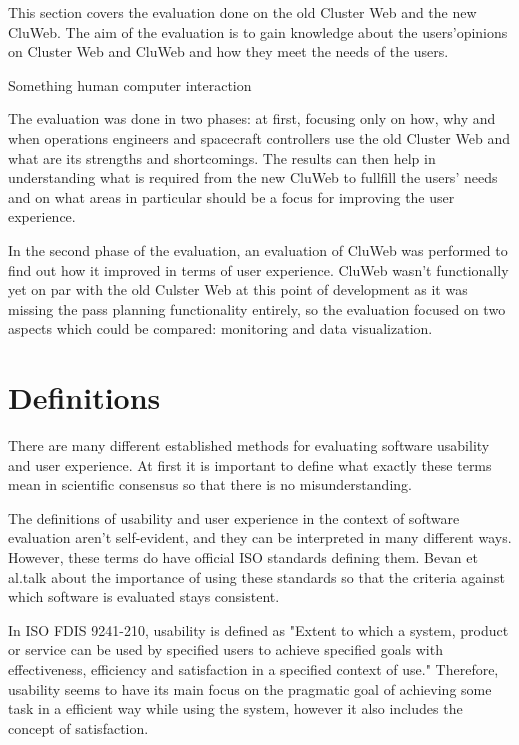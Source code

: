 
This section covers the evaluation done on the old Cluster Web and the new CluWeb. The aim of the evaluation is to gain knowledge about the users'opinions on Cluster Web and CluWeb and how they meet the needs of the users.

Something human computer interaction \cite{4839639}

The evaluation was done in two phases: at first, focusing only on how, why and when operations engineers and spacecraft controllers use the old Cluster Web and what are its strengths and shortcomings. The results can then help in understanding what is required from the new CluWeb to fullfill the users' needs and on what areas in particular should be a focus for improving the user experience.

In the second phase of the evaluation, an evaluation of CluWeb was performed to find out how it improved in terms of user experience. CluWeb wasn't functionally yet on par with the old Culster Web at this point of development as it was missing the pass planning functionality entirely, so the evaluation focused on two aspects which could be compared: monitoring and data visualization.

\section{Definitions}\label{definitions_section}

There are many different established methods for evaluating software usability and user experience. At first it is important to define what exactly these terms mean in scientific consensus so that there is no misunderstanding.

The definitions of usability and user experience in the context of software evaluation aren't self-evident, and they can be interpreted in many different ways. However, these terms do have official ISO standards defining them. Bevan et al.talk about the importance of using these standards so that the criteria against which software is evaluated stays consistent. \cite{bevanstandard}

In  ISO FDIS 9241-210, usability is defined as "Extent to which  a system, product or service can be used by specified users to achieve specified goals with effectiveness, efficiency and satisfaction in a specified context of use." Therefore, usability seems to have its main focus on the pragmatic goal of achieving some task in a efficient way while using the system, however it also includes the concept of satisfaction.

